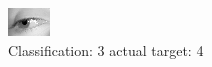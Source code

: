 \begin{figure}[h!]
\begin{center}
\includegraphics[width=0.60\columnwidth]{figures/ID2988_class_3_target_4.png}
\end{center}
\caption{ Classification: 3 actual target: 4}
\label{fig:ID2988_class_3_target_4}
\end{figure}
